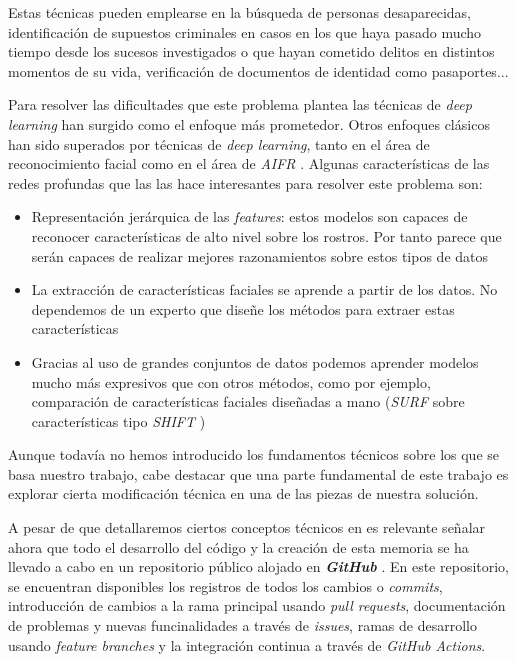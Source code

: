 Estas técnicas pueden emplearse en la búsqueda de personas desaparecidas, identificación de supuestos criminales en casos en los que haya pasado mucho tiempo desde los sucesos investigados o que hayan cometido delitos en distintos momentos de su vida, verificación de documentos de identidad como pasaportes... \cite{informatica:aifr_survey}

Para resolver las dificultades que este problema plantea las técnicas de \textit{deep learning} han surgido como el enfoque más prometedor. Otros enfoques clásicos han sido superados por técnicas de \textit{deep learning}, tanto en el área de reconocimiento facial \cite{informatica:deep_fr_survey} como en el área de \textit{AIFR} \cite{informatica:aifr_survey}. Algunas características de las redes profundas que las las hace interesantes para resolver este problema son:

\begin{itemize}
    \item Representación jerárquica de las \textit{features}: estos modelos son capaces de reconocer características de alto nivel sobre los rostros. Por tanto parece que serán capaces de realizar mejores razonamientos sobre estos tipos de datos
    \item La extracción de características faciales se aprende a partir de los datos. No dependemos de un experto que diseñe los métodos para extraer estas características
    \item Gracias al uso de grandes conjuntos de datos podemos aprender modelos mucho más expresivos que con otros métodos, como por ejemplo, comparación de características faciales diseñadas a mano (\textit{SURF} sobre características tipo \textit{SHIFT} \cite{informatica:libro_surf})
\end{itemize}

Aunque todavía no hemos introducido los fundamentos técnicos sobre los que se basa nuestro trabajo, cabe destacar que una parte fundamental de este trabajo es explorar cierta modificación técnica en una de las piezas de nuestra solución.

A pesar de que detallaremos ciertos conceptos técnicos en  es relevante señalar ahora que todo el desarrollo del código y la creación de esta memoria se ha llevado a cabo en un repositorio público alojado en \textbf{\textit{GitHub}} \cite{informatica:repogithub}. En este repositorio, se encuentran disponibles los registros de todos los cambios o \textit{commits}, introducción de cambios a la rama principal usando \textit{pull requests}, documentación de problemas y nuevas funcinalidades a través de \textit{issues}, ramas de desarrollo usando \textit{feature branches} y la integración continua a través de \textit{GitHub Actions}.

